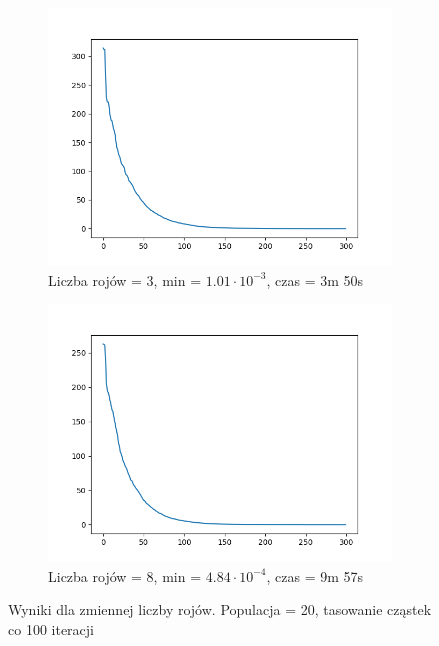 \documentclass[12pt]{article}
\begin{document}
\begin{figure}[H]
    \centering
    \begin{subfigure}{0.49\textwidth}
        \centering
        \includegraphics[width=\linewidth]{plots/MPSO/3_best.png}
        \caption{Liczba rojów = 3, min = $1.01\cdot 10^{-3}$, czas = 3m 50s}
    \end{subfigure}
    \begin{subfigure}{0.49\textwidth}
        \centering
        \includegraphics[width=\linewidth]{plots/MPSO/4_best.png}
        \caption{Liczba rojów = 8, min = $4.84\cdot 10^{-4}$, czas = 9m 57s}
    \end{subfigure}
    \caption{Wyniki dla zmiennej liczby rojów. Populacja = 20, tasowanie cząstek co 100 iteracji}
\end{figure}
\end{document}
